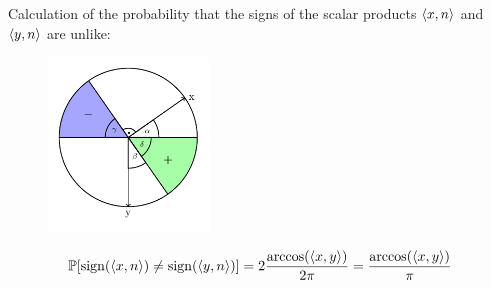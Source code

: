 	\begin{frame}
		\begin{pbmr}
			Calculation of the probability that the signs of the scalar products $\langle{x},{n}\rangle$ and $\langle{y},{n}\rangle$ are unlike:
			\begin{figure}
				\begin{center}
					\includegraphics[width=0.38\textwidth]{ChapersPresentation/fig_unit_circle.pdf}
				\end{center}
				\vspace{-2em}
			\end{figure}
			\begin{align*}
				\mathbb{P}[\operatorname{sign}(\langle{x},{n}\rangle)\neq\operatorname{sign}(\langle{y},{n}\rangle)]=2\frac{\arccos(\langle{x},{y}\rangle)}{2\pi} = \frac{\arccos(\langle{x},{y}\rangle)}{\pi}
			\end{align*}
		\end{pbmr}
	\end{frame}
	
